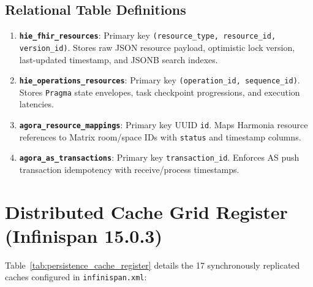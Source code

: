 \subsection{Relational Table Definitions}
\begin{enumerate}
    \item \textbf{\nolinkurl{hie_fhir_resources}}: Primary key \nolinkurl{(resource_type, resource_id, version_id)}. Stores raw JSON resource payload, optimistic lock version, last-updated timestamp, and JSONB search indexes.
    \item \textbf{\nolinkurl{hie_operations_resources}}: Primary key \nolinkurl{(operation_id, sequence_id)}. Stores \nolinkurl{Pragma} state envelopes, task checkpoint progressions, and execution latencies.
    \item \textbf{\nolinkurl{agora_resource_mappings}}: Primary key UUID \nolinkurl{id}. Maps Harmonia resource references to Matrix room/space IDs with \nolinkurl{status} and timestamp columns.
    \item \textbf{\nolinkurl{agora_as_transactions}}: Primary key \nolinkurl{transaction_id}. Enforces AS push transaction idempotency with receive/process timestamps.
\end{enumerate}

\section{Distributed Cache Grid Register (Infinispan 15.0.3)}

Table~\ref{tab:persistence_cache_register} details the 17 synchronously replicated caches configured in \nolinkurl{infinispan.xml}:

